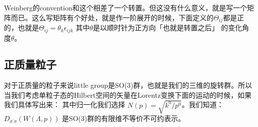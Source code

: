 


Weinberg的convention和这个相差了一个转置。但这没有什么意义，就是写一个矩阵而已。这么写矩阵有个好处，就是作一阶展开的时候，下面定义的$ \Theta_{ij} $都是正的，也就是$ \Theta_{ij} = \theta_k \epsilon_{ijk} $  其中$ \theta $是以顺时针为正方向「也就是转置之后」 的变化角度$ \theta $。 


\subsection{正质量粒子}
对于正质量的粒子来说little group是SO(3)群，也就是我们的三维的旋转群。所以当我们考虑单粒子态的Hilbert空间的矢量在Lorentz变换下面的运动的时候，如果我们具体写出来：
其中归一化我们选择 $ N(p)=\sqrt{k^0/p^0} $。我们知道：$ D_{\sigma^{\prime}\sigma}\left(W(\Lambda,p)\right) $ 是SO(3)群的有限维不等价不可约表示。

